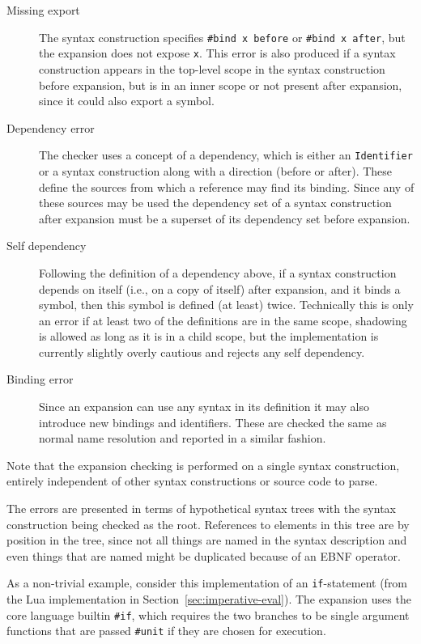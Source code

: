 \documentclass{kththesis}
\begin{document}
\begin{description}
  \item[Missing export] The syntax construction specifies \texttt{#bind x before} or \texttt{#bind x after}, but the expansion does not expose \texttt{x}. This error is also produced if a syntax construction appears in the top-level scope in the syntax construction before expansion, but is in an inner scope or not present after expansion, since it could also export a symbol.

  \item[Dependency error] The checker uses a concept of a dependency, which is either an \texttt{Identifier} or a syntax construction along with a direction (before or after). These define the sources from which a reference may find its binding. Since any of these sources may be used the dependency set of a syntax construction after expansion must be a superset of its dependency set before expansion.

  \item[Self dependency] Following the definition of a dependency above, if a syntax construction depends on itself (i.e., on a copy of itself) after expansion, and it binds a symbol, then this symbol is defined (at least) twice. Technically this is only an error if at least two of the definitions are in the same scope, shadowing is allowed as long as it is in a child scope, but the implementation is currently slightly overly cautious and rejects any self dependency.

  \item[Binding error] Since an expansion can use any syntax in its definition it may also introduce new bindings and identifiers. These are checked the same as normal name resolution and reported in a similar fashion.
\end{description}

Note that the expansion checking is performed on a single syntax construction, entirely independent of other syntax constructions or source code to parse.

The errors are presented in terms of hypothetical syntax trees with the syntax construction being checked as the root. References to elements in this tree are by position in the tree, since not all things are named in the syntax description and even things that are named might be duplicated because of an EBNF operator.

As a non-trivial example, consider this implementation of an \texttt{if}-statement (from the Lua implementation in Section~\ref{sec:imperative-eval}). The expansion uses the core language builtin \texttt{#if}, which requires the two branches to be single argument functions that are passed \texttt{#unit} if they are chosen for execution.
\end{document}
